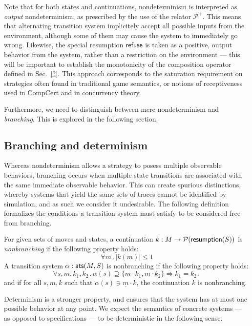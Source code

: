 { \color{gray}
Note that for both states and continuations,
nondeterminism is interpreted as \emph{output} nondeterminism,
as prescribed by the use of the relator $\mathcal{P}^+$.
This means that alternating transition system
implicitely accept all possible inputs from the environment,
although some of them may cause the system to immediately go wrong.
Likewise,
the special resumption $ \mathsf{refuse} $
is taken as a positive, output behavior from the system,
rather than a restriction on the environment ---
this will be important to establish the monotonicity
of the composition operator defined in Sec.~\ref{?}.
This approach corresponds to the saturation requirement on strategies
often found in traditional game semantics,
or notions of receptiveness used in CompCert
and in concurrency theory.

Furthermore, we need to distinguish between mere nondeterminism
and \emph{branching}.
This is explored in the following section.

\subsection{Branching and determinism}

Whereas nondeterminism allows a strategy to posess
multiple observable behaviors,
branching occurs when multiple state transitions
are associated with the same immediate observable behavior.
This can create spurious distinctions,
whereby systems that yield the same sets of traces
cannot be identified by simulation,
and as such we consider it undesirable.
The following definition
formalizes the conditions a transition system must satisfy
to be considered free from branching.

\begin{definition}
For given sets of moves and states,
a continuation $k : M \rightarrow \mathcal{P}( \mathsf{resumption} (S))$
is \emph{nonbranching} if the following property holds:
\[ \forall m \,.\, | k(m) | \le 1 \]
A transition system $\alpha :  \mathsf{ats} (M, S)$ is nonbranching
if the following property holds:
\[ \forall s, m, k_1, k_2 \,.\,
     \alpha(s) \supseteq \{ m \cdot k_1, m \cdot k_2 \} \Rightarrow
     k_1 = k_2 \,, \]
and if for all $s, m, k$ such that $\alpha(s) \ni \underline{m} \cdot k$,
the continuation $k$ is nonbranching.
\end{definition}

Determinism is a stronger property,
and ensures that the system has at most one possible behavior
at any point.
We expect the semantics of concrete systems ---
as opposed to specifications ---
to be deterministic in the following sense.

}
